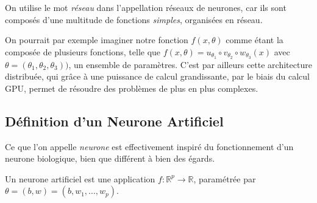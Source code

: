 \documentclass[a4paper, 10pt]{report}
\begin{document}
On utilise le mot \emph{réseau} dans l’appellation réseaux de neurones, car ils sont composés d'une multitude de fonctions \emph{simples}, organisées en réseau.

On pourrait par exemple imaginer notre fonction $f(x,\theta)$ comme étant la composée de plusieurs fonctions, telle que $f(x,\theta) = u_{\theta_1} \circ v_{\theta_2} \circ w_{\theta_3}(x)$ avec $\theta = (\theta_1,\theta_2, \theta_3))$, un ensemble de paramètres.
C'est par ailleurs cette architecture distribuée, qui grâce à une puissance de calcul grandissante, par le biais du calcul GPU, permet de résoudre des problèmes de plus en plus complexes.
\subsection{Définition d'un Neurone Artificiel}
Ce que l'on appelle \emph{neurone} est effectivement inspiré du fonctionnement d'un neurone biologique, bien que différent à bien des égards.

Un neurone artificiel est une application $f : \mathbb{R}^p \rightarrow \mathbb{R}$, paramétrée par $\theta = (b,w) = (b, w_1, ..., w_p)$.
\end{document}
